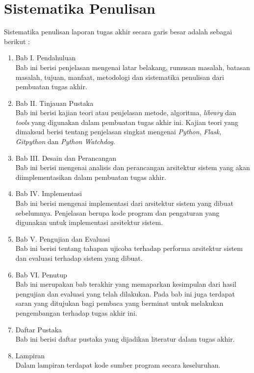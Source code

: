 	\section{Sistematika Penulisan}
 		Sistematika penulisan laporan tugas akhir secara garis besar adalah sebagai berikut :
 		\begin{enumerate}
 			\item Bab I. Pendahuluan \\
 				Bab ini berisi penjelasan mengenai latar belakang, rumusan masalah, batasan masalah, tujuan, manfaat, metodologi dan sistematika penulisan dari pembuatan tugas akhir.
 			\item Bab II. Tinjauan Pustaka \\
 				Bab ini berisi kajian teori atau penjelasan metode, algoritma, \textit{library} dan \textit{tools} yang digunakan dalam pembuatan tugas akhir ini. Kajian teori yang dimaksud berisi tentang penjelasan singkat mengenai \textit{Python}, \textit{Flask}, \textit{Gitpython} dan \textit{Python Watchdog}.
 			\item Bab III. Desain dan Perancangan \\
 				Bab ini berisi mengenai analisis dan perancangan arsitektur sistem yang akan diimplementasikan dalam pembuatan tugas akhir.
 			\item Bab IV. Implementasi \\
 				Bab ini berisi mengenai implementasi dari arsitektur sistem yang dibuat sebelumnya. Penjelasan berupa kode program dan pengaturan yang digunakan untuk implementasi arsitektur sistem.
 			\item Bab V. Pengujian dan Evaluasi \\
 				Bab ini berisi tentang tahapan ujicoba terhadap performa arsitektur sistem dan evaluasi terhadap sistem yang dibuat. 
 			\item Bab VI. Penutup \\
 				Bab ini merupakan bab terakhir yang memaparkan kesimpulan dari hasil pengujian dan evaluasi yang telah dilakukan. Pada bab ini juga terdapat saran yang ditujukan bagi pembaca yang berminat untuk melakukan pengembangan terhadap tugas akhir ini.
 			\item Daftar Pustaka \\
 				Bab ini berisi daftar pustaka yang dijadikan literatur dalam tugas akhir.
 			\item Lampiran \\
 				Dalam lampiran terdapat kode sumber program secara keseluruhan.
 		\end{enumerate}